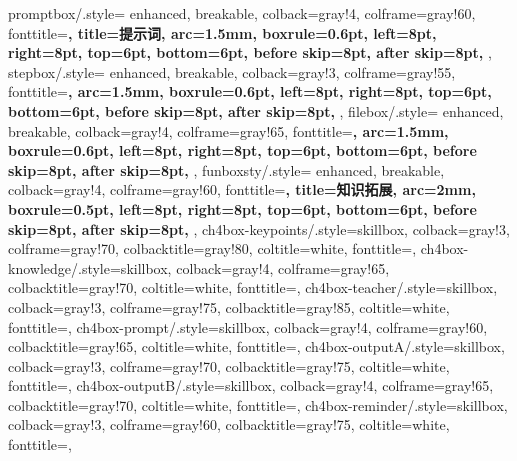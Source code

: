 {    promptbox/.style={
        enhanced, breakable,
        colback=gray!4,        %
        colframe=gray!60,      %
        fonttitle=\bfseries,
        title=提示词,
        arc=1.5mm, boxrule=0.6pt,
        left=8pt, right=8pt, top=6pt, bottom=6pt,
        before skip=8pt, after skip=8pt,
    },
    stepbox/.style={
        enhanced, breakable,
        colback=gray!3,        %
        colframe=gray!55,      %
        fonttitle=\bfseries,
        arc=1.5mm, boxrule=0.6pt,
        left=8pt, right=8pt, top=6pt, bottom=6pt,
        before skip=8pt, after skip=8pt,
    },
    filebox/.style={
        enhanced, breakable,
        colback=gray!4,        %
        colframe=gray!65,      %
        fonttitle=\bfseries,
        arc=1.5mm, boxrule=0.6pt,
        left=8pt, right=8pt, top=6pt, bottom=6pt,
        before skip=8pt, after skip=8pt,
    },
    funboxsty/.style={
        enhanced, breakable,
        colback=gray!4,        %
        colframe=gray!60,      %
        fonttitle=\bfseries,
        title=知识拓展,
        arc=2mm, boxrule=0.5pt,
        left=8pt, right=8pt, top=6pt, bottom=6pt,
        before skip=8pt, after skip=8pt,
    },
    ch4box-keypoints/.style={skillbox, colback=gray!3, colframe=gray!70, colbacktitle=gray!80, coltitle=white, fonttitle=\bfseries},
    ch4box-knowledge/.style={skillbox, colback=gray!4, colframe=gray!65, colbacktitle=gray!70, coltitle=white, fonttitle=\bfseries},
    ch4box-teacher/.style={skillbox, colback=gray!3, colframe=gray!75, colbacktitle=gray!85, coltitle=white, fonttitle=\bfseries},
    ch4box-prompt/.style={skillbox, colback=gray!4, colframe=gray!60, colbacktitle=gray!65, coltitle=white, fonttitle=\bfseries},
    ch4box-outputA/.style={skillbox, colback=gray!3, colframe=gray!70, colbacktitle=gray!75, coltitle=white, fonttitle=\bfseries},
    ch4box-outputB/.style={skillbox, colback=gray!4, colframe=gray!65, colbacktitle=gray!70, coltitle=white, fonttitle=\bfseries},
    ch4box-reminder/.style={skillbox, colback=gray!3, colframe=gray!60, colbacktitle=gray!75, coltitle=white, fonttitle=\bfseries},
}


\newenvironment{lightquote}{%
    \begin{tcolorbox}[textbookquote]\small}{%
    \end{tcolorbox}}

